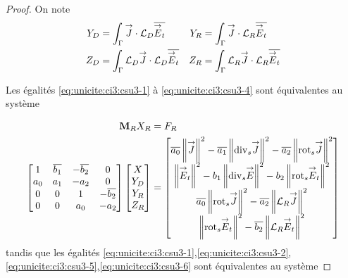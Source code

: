 \begin{proof}
    On note
    \begin{align*}
      Y_D &= \int_\Gamma \vJ \cdot \LD \conj{\vE_t}  &
      Y_R &= \int_\Gamma \vJ \cdot \LR \conj{\vE_t} 
      \\
      Z_D &= \int_\Gamma \LD \vJ \cdot \LD \conj{\vE_t}  &
      Z_R &= \int_\Gamma \LR \vJ \cdot \LR \conj{\vE_t} 
    \end{align*}

    Les égalités \eqref{eq:unicite:ci3:csu3-1} à \eqref{eq:unicite:ci3:csu3-4} sont équivalentes au système

    \begin{align*}
      \mM_R X_R &= F_R
      \\
      \begin{bmatrix}
        1 & \conj{b_1} & -\conj{b_2} & 0
        \\
        a_0 & a_1 & -a_2 & 0
        \\
        0 & 0 & 1 & -\conj{b_2}
        \\
        0 & 0 & a_0 & -a_2
        \\
      \end{bmatrix}
      \begin{bmatrix}
        X\\
        Y_D\\
        Y_R\\
        Z_R
      \end{bmatrix}
      &=
      \begin{bmatrix}
        \conj{a_0} \norm{\vJ}^2 - \conj{a_1} \norm{\tdivs \vJ}^2 - \conj{a_2} \norm{\trots \vJ}^2
        \\
        \norm{\vE_t}^2  - b_1 \norm{\tdivs \vE}^2  - b_2 \norm{\trots \vE_t}^2
        \\
        \conj{a_0} \norm{\trots \vJ}^2 - \conj{a_2} \norm{\LR \vJ}^2
        \\
        \norm{\trots \vE_t}^2 - \conj{b_2} \norm{\LR \vE_t}^2
      \end{bmatrix}
    \end{align*}
    tandis que les égalités \eqref{eq:unicite:ci3:csu3-1},\eqref{eq:unicite:ci3:csu3-2},\eqref{eq:unicite:ci3:csu3-5},\eqref{eq:unicite:ci3:csu3-6} sont équivalentes au système


\end{proof}
